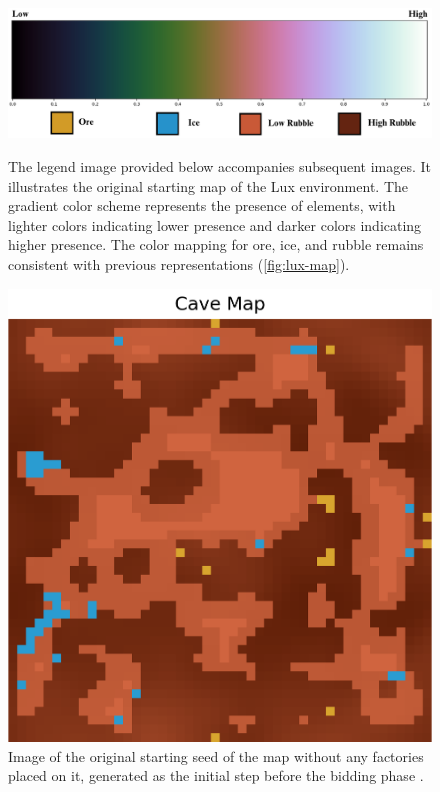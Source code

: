 \begin{figure}[htbp]
    \centering
    \begin{minipage}{1\textwidth}
        \centering
        \includegraphics[width=\linewidth]{images/methods_mono/factory_placement/grad.png}
        \captionsetup{justification=justified, singlelinecheck=false, width=1\linewidth, labelfont=bf} 
        \caption{The legend image provided below accompanies subsequent images. It illustrates the original starting map of the Lux environment. The gradient color scheme represents the presence of elements, with lighter colors indicating lower presence and darker colors indicating higher presence. The color mapping for ore, ice, and rubble remains consistent with previous representations (\autoref{fig:lux-map}).}
        \label{fig:grad-image}
    \end{minipage}\hfill
    \centering
    \begin{minipage}{1\textwidth}
        \centering
        \includegraphics[width=0.38\linewidth]{images/methods_mono/factory_placement/cave_map.png}
        \captionsetup{justification=justified, singlelinecheck=false, width=1\linewidth, labelfont=bf} 
        \caption{Image of the original starting seed of the map without any factories placed on it, generated as the initial step before the bidding phase \protect \footnotemark.}
        \label{fig:grad-map}
    \end{minipage}\hfill
    \vspace{8pt}
    

\end{figure}
